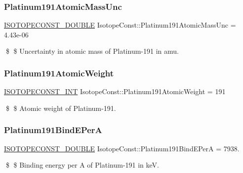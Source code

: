 \subsubsection{\texorpdfstring{Platinum191\+Atomic\+Mass\+Unc}{Platinum191AtomicMassUnc}}
{\footnotesize\ttfamily \mbox{\hyperlink{group___isotope_const-_macros_ga8f45a7272ce02c0b4c65c44636ed719a}{I\+S\+O\+T\+O\+P\+E\+C\+O\+N\+S\+T\+\_\+\+D\+O\+U\+B\+LE}} Isotope\+Const\+::\+Platinum191\+Atomic\+Mass\+Unc = 4.\+43e-\/06}

\$ \$ Uncertainty in atomic mass of Platinum-\/191 in amu. \mbox{\label{group___isotope_const-_platinum-_pt191_gab3ed6348ca27863478fbc39ae639d3b9}} 
\subsubsection{\texorpdfstring{Platinum191\+Atomic\+Weight}{Platinum191AtomicWeight}}
{\footnotesize\ttfamily \mbox{\hyperlink{group___isotope_const-_macros_ga5f18360b3e99483a35c32d789e62621c}{I\+S\+O\+T\+O\+P\+E\+C\+O\+N\+S\+T\+\_\+\+I\+NT}} Isotope\+Const\+::\+Platinum191\+Atomic\+Weight = 191}

\$ \$ Atomic weight of Platinum-\/191. \mbox{\label{group___isotope_const-_platinum-_pt191_ga71bc14d972c42b740d4a7f68361e5ea0}} 
\subsubsection{\texorpdfstring{Platinum191\+Bind\+E\+PerA}{Platinum191BindEPerA}}
{\footnotesize\ttfamily \mbox{\hyperlink{group___isotope_const-_macros_ga8f45a7272ce02c0b4c65c44636ed719a}{I\+S\+O\+T\+O\+P\+E\+C\+O\+N\+S\+T\+\_\+\+D\+O\+U\+B\+LE}} Isotope\+Const\+::\+Platinum191\+Bind\+E\+PerA = 7938.}

\$ \$ Binding energy per A of Platinum-\/191 in keV. \mbox{\label{group___isotope_const-_platinum-_pt191_gabe41697989ff982edc7a43b077d98aa3}} 
